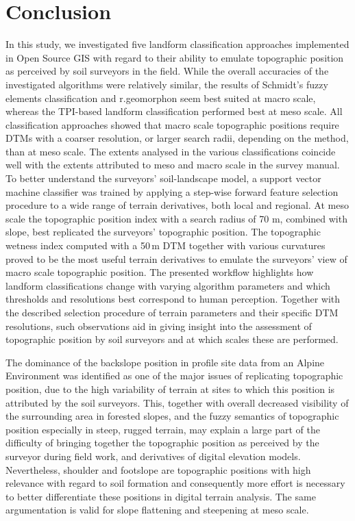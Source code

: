 \documentclass[preprint,12pt,authoryear]{elsarticle}
\begin{document}
\section{Conclusion}
In this study, we investigated five landform classification approaches implemented in Open Source GIS with regard to their ability to emulate topographic position as perceived by soil surveyors in the field. While the overall accuracies of the investigated algorithms were relatively similar, the results of Schmidt's fuzzy elements classification and r.geomorphon seem best suited at macro scale, whereas the TPI-based landform classification performed best at meso scale. All classification approaches showed that macro scale topographic positions require DTMs with a coarser resolution, or larger search radii, depending on the method, than at meso scale. The extents analysed in the various classifications coincide well with the extents attributed to meso and macro scale in the survey manual. To better understand the surveyors' soil-landscape model, a support  vector machine classifier was trained by applying a step-wise forward feature selection procedure to a wide range of terrain derivatives, both local and regional. At meso scale the topographic position index with a search radius of 70 m, combined with slope, best replicated the surveyors' topographic position. The topographic wetness index computed with a 50\,m DTM together with various curvatures proved to be the most useful terrain derivatives to emulate the surveyors' view of macro scale topographic position. The presented workflow highlights how landform classifications change with varying algorithm parameters and which thresholds and resolutions best correspond to human perception. Together with the described selection procedure of terrain parameters and their specific DTM resolutions, such observations aid in giving insight into the assessment of topographic position by soil surveyors and at which scales these are performed.
  
The dominance of the backslope position in profile site data from an Alpine Environment was identified as one of the major issues of replicating topographic position, due to the high variability of terrain at sites to which this position is attributed by the soil surveyors. This, together with overall decreased visibility of the surrounding area in forested slopes, and the fuzzy semantics of topographic position especially in steep, rugged terrain, may explain a large part of the difficulty of bringing together the topographic position as perceived by the surveyor during field work, and derivatives of digital elevation models. Nevertheless, shoulder and footslope are topographic positions with high relevance with regard to soil formation and consequently more effort is necessary to better differentiate these positions in digital terrain analysis. The same argumentation is valid for slope flattening and steepening at meso scale.
\end{document}
